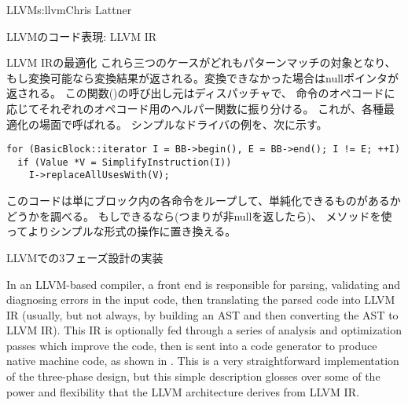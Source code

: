 \begin{aosachapter}{LLVM}{s:llvm}{Chris Lattner}
\begin{aosasect1}{LLVMのコード表現: LLVM IR}
\begin{aosasect2}{LLVM IRの最適化}
これら三つのケースがどれもパターンマッチの対象となり、
もし変換可能なら変換結果が返される。変換できなかった場合はnullポインタが返される。
この関数()の呼び出し元はディスパッチャで、
命令のオペコードに応じてそれぞれのオペコード用のヘルパー関数に振り分ける。
これが、各種最適化の場面で呼ばれる。
シンプルなドライバの例を、次に示す。

\begin{verbatim}
for (BasicBlock::iterator I = BB->begin(), E = BB->end(); I != E; ++I)
  if (Value *V = SimplifyInstruction(I))
    I->replaceAllUsesWith(V);
\end{verbatim}

\noindent
このコードは単にブロック内の各命令をループして、単純化できるものがあるかどうかを調べる。
もしできるなら(つまりが非nullを返したら)、
メソッドを使ってよりシンプルな形式の操作に置き換える。

\end{aosasect2}

\end{aosasect1}

\begin{aosasect1}{LLVMでの3フェーズ設計の実装}

In an LLVM-based compiler, a front end is responsible for parsing,
validating and diagnosing errors in the input code, then translating
the parsed code into LLVM IR (usually, but not always, by building an
AST and then converting the AST to LLVM IR).  This IR is optionally
fed through a series of analysis and optimization passes which improve
the code, then is sent into a code generator to produce native machine
code, as shown in . This is a very
straightforward implementation of the three-phase design, but this
simple description glosses over some of the power and flexibility
that the LLVM architecture derives from LLVM IR.


\end{aosasect1}
\end{aosachapter}
